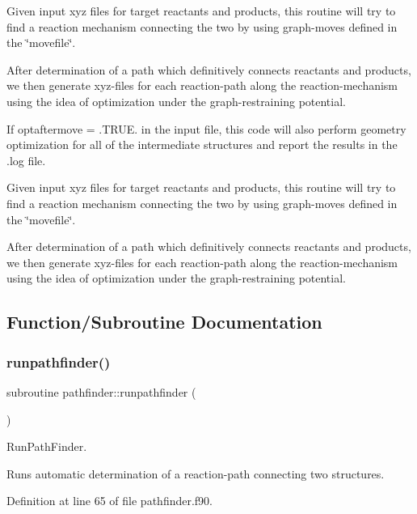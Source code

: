 Given input xyz files for target reactants and products, this routine will try to find a reaction mechanism connecting the two by using graph-\/moves defined in the \char`\"{}movefile\char`\"{}.

After determination of a path which definitively connects reactants and products, we then generate xyz-\/files for each reaction-\/path along the reaction-\/mechanism using the idea of optimization under the graph-\/restraining potential.

If optaftermove = .T\+R\+UE. in the input file, this code will also perform geometry optimization for all of the intermediate structures and report the results in the .log file.

Given input xyz files for target reactants and products, this routine will try to find a reaction mechanism connecting the two by using graph-\/moves defined in the \char`\"{}movefile\char`\"{}.

After determination of a path which definitively connects reactants and products, we then generate xyz-\/files for each reaction-\/path along the reaction-\/mechanism using the idea of optimization under the graph-\/restraining potential. 

\subsection{Function/\+Subroutine Documentation}
\mbox{\label{namespacepathfinder_a7ce0d0c193755a13466c3a5c273b21d2}} 
\subsubsection{\texorpdfstring{runpathfinder()}{runpathfinder()}}
{\footnotesize\ttfamily subroutine pathfinder\+::runpathfinder (\begin{DoxyParamCaption}{ }\end{DoxyParamCaption})}



Run\+Path\+Finder. 

Runs automatic determination of a reaction-\/path connecting two structures. 

Definition at line 65 of file pathfinder.\+f90.

\mbox{\label{namespacepathfinder_ac162e64b047281f6a8040365318bf631}} 
